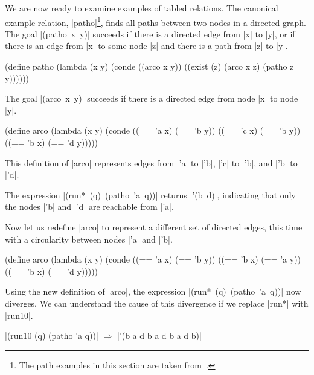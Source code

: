 We are now ready to examine examples of tabled relations.  The
canonical example relation, \scheme|patho|\footnote{The path examples
  in this section are taken from~\citet{memoingforlp}.}, finds all
paths between two nodes in a directed graph.  The goal
\mbox{\scheme|(patho x y)|} succeeds if there is a directed edge from
\scheme|x| to \scheme|y|, or if there is an edge from \scheme|x| to
some node \scheme|z| and there is a path from \scheme|z| to
\scheme|y|.

\schemedisplayspace
\begin{schemedisplay}
(define patho
  (lambda (x y)
    (conde
      ((arco x y))
      ((exist (z)
         (arco x z)
         (patho z y))))))
\end{schemedisplay}

\noindent The goal \mbox{\scheme|(arco x y)|} succeeds if there is a
directed edge from node \scheme|x| to node \scheme|y|.

\schemedisplayspace
\begin{schemedisplay}
(define arco
  (lambda (x y)
    (conde
      ((== 'a x) (== 'b y))
      ((== 'c x) (== 'b y))
      ((== 'b x) (== 'd y)))))
\end{schemedisplay}

\noindent This definition of \scheme|arco| represents edges from
\scheme|'a| to \scheme|'b|, \scheme|'c| to \scheme|'b|, and
\scheme|'b| to \scheme|'d|.

\noindent The expression \mbox{\scheme|(run* (q) (patho 'a q))|}
returns \mbox{\scheme|'(b d)|}, indicating that only the nodes
\scheme|'b| and \scheme|'d| are reachable from \scheme|'a|.

Now let us redefine \scheme|arco| to represent a different set of
directed edges, this time with a circularity between nodes \scheme|'a|
and \scheme|'b|.

\newpage

\schemedisplayspace \begin{schemedisplay}
(define arco
  (lambda (x y)
    (conde
      ((== 'a x) (== 'b y))
      ((== 'b x) (== 'a y))
      ((== 'b x) (== 'd y)))))
\end{schemedisplay}

\noindent Using the new definition of \scheme|arco|, the expression
\mbox{\scheme|(run* (q) (patho 'a q))|} now diverges.  We can
understand the cause of this divergence if we replace \scheme|run*|
with \scheme|run10|.

\wspace

\noindent\scheme|(run10 (q) (patho 'a q))|  $\Rightarrow$ \scheme|'(b a d b a d b a d b)|

